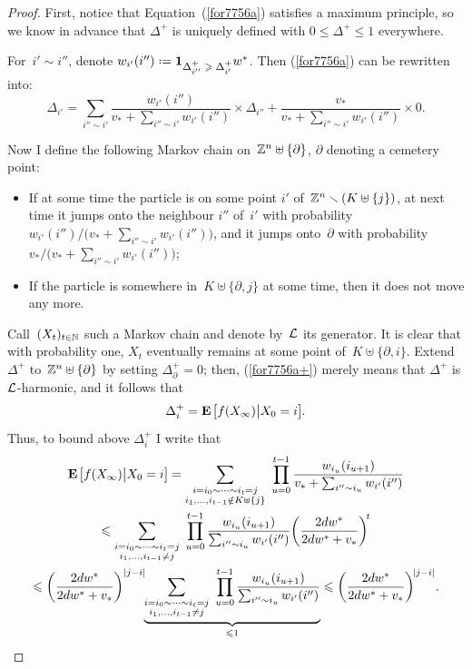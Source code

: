 \begingroup{}
\begin{proof}
First, notice that Equation~(\ref{for7756a}) satisfies a maximum principle,
so we know in advance that $\Delta^+$ is uniquely defined with $0 \leq \Delta^+ \leq 1$ everywhere.

For~$i'\sim i''$, denote $w_{i'}(i'') \coloneqq \1{\Delta^+_{i''} \geq \Delta^+_{i'}} w^*$.
Then (\ref{for7756a}) can be rewritten into:
\[\label{for7756a+} \Delta_{i'} =
\sum_{i''\sim i'} \frac{w_{i'}(i'')}{v_*+\sum_{i''\sim i'}w_{i'}(i'')} \times \Delta_{i''}
+ \frac{v_*}{v_*+\sum_{i''\sim i'}w_{i'}(i'')} \times 0 .\]

Now I define the following Markov chain on~$\mathbb{Z}^n \uplus \{\partial\}$,
$\partial$ denoting a cemetery point:
\begin{Def}\strut
\begin{itemize}
\item If at some time the particle is on some point $i'$ of~$\mathbb{Z}^n \smallsetminus (K\uplus\{j\})$,
at next time it jumps onto the neighbour $i''$ of~$i'$ with probability
$w_{i'}(i'') \mathbin{\big/} \big(v_*+\sum_{i''\sim i'}w_{i'}(i'')\big)$,
and it jumps onto~$\partial$ with probability
$v_* \mathbin{\big/} {\big(v_*+\sum_{i''\sim i'}w_{i'}(i'')\big)}$;
\item If the particle is somewhere in~$K \uplus \{\partial,j\}$ at some time,
then it does not move any more.
\end{itemize}
\end{Def}
%
Call~$(X_t)_{t\in\mathbb{N}}$ such a Markov chain and denote by~$\mathcal{L}$ its generator.
It is clear that with probability one,
$X_t$ eventually remains at some point of~$K\uplus\{\partial,i\}$.
Extend $\Delta^+$ to~$\mathbb{Z}^n\uplus\{\partial\}$ by setting $\Delta^+_\partial = 0$;
then, (\ref{for7756a+}) merely means that $\Delta^+$ is $\mathcal{L}$-harmonic,
and it follows that
\[ \Delta^+_i = \EE \big[ f(X_\infty) \big| X_0=i \big] .\]
%
Thus, to bound above $\Delta^+_i$ I write that
\begin{multline} \EE\big[f(X_\infty)\big|X_0=i\big]
= \sum_{\substack{i=i_0\sim\cdots\sim i_t=j\\i_1,\ldots,i_{t-1}\notin K\uplus\{j\}}}
\,\,\prod_{u=0}^{t-1} \frac{w_{i_u}(i_{u+1})}{v_*+\sum_{i''\sim i_u}w_{i'}(i'')} \\
\leq \sum_{\substack{i=i_0\sim\cdots\sim i_t=j\\i_1,\ldots,i_{t-1}\neq j}}
\,\,\prod_{u=0}^{t-1} \frac{w_{i_u}(i_{u+1})}{\sum_{i''\sim i_u}w_{i'}(i'')}
\bigg( \frac{2dw^*}{2dw^*+v_*} \bigg)^{\!t} \\
\leq \bigg( \frac{2dw^*}{2dw^*+v_*} \bigg)^{|j-i|}\!\!
\underbrace{\sum_{\substack{i=i_0\sim\cdots\sim i_t=j\\i_1,\ldots,i_{t-1}\neq j}}
\,\,\prod_{u=0}^{t-1} \frac{w_{i_u}(i_{u+1})}{\sum_{i''\sim i_u}w_{i'}(i'')}}_{\leq 1}
\leq \bigg( \frac{2dw^*}{2dw^*+v_*} \bigg)^{\!|j-i|}.
\end{multline}
\end{proof}\endgroup

